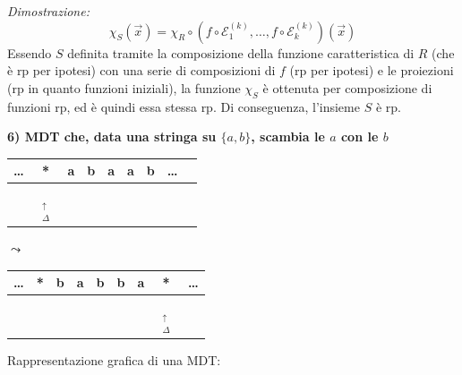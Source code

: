 \textit{Dimostrazione:}
$$ \chi_S(\vec{x}) = \chi_R \circ (f \circ \mathcal{E}_1^{(k)}, \dots, f \circ \mathcal{E}_k^{(k)})(\vec{x}) $$
Essendo $S$ definita tramite la composizione della funzione caratteristica di $R$ (che è rp per ipotesi) con una serie di composizioni di $f$ (rp per ipotesi) e le proiezioni (rp in quanto funzioni iniziali), la funzione $\chi_S$ è ottenuta per composizione di funzioni rp, ed è quindi essa stessa rp. Di conseguenza, l'insieme $S$ è rp.






\vspace{0.6cm}
\textbf{6) MDT che, data una stringa su $\{a, b\}$, scambia le $a$ con le $b$}

\begin{center}
\begin{tabular}{c|c|c|c|c|c|c|c|c}
\hline
\dots & * & a & b & a & a & b & \dots & \\
\hline
\multicolumn{1}{c}{} & \multicolumn{1}{c}{$\underset{\substack{\uparrow \\ \Delta}}{\phantom{*}}$} & \multicolumn{7}{c}{} \\
\end{tabular}
$\leadsto$
\begin{tabular}{c|c|c|c|c|c|c|c|c}
\hline
\dots & * & b & a & b & b & a & * & \dots \\
\hline
\multicolumn{7}{c}{} & \multicolumn{1}{c}{$\underset{\substack{\uparrow \\ \Delta}}{\phantom{*}}$} & \multicolumn{1}{c}{} \\
\end{tabular}
\end{center}

\begin{center}
\quad\quad
\begin{minipage}{5cm}
\centering
\scriptsize Rappresentazione grafica di una MDT:\\
\vspace{0.2cm}
\end{minipage}
\end{center}

